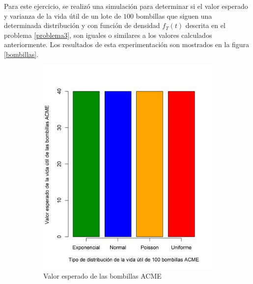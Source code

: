 \documentclass{article}
\begin{document}
Para este ejercicio, se realizó una simulación para determinar si el valor esperado y varianza de la vida útil de un lote de $100$ bombillas que siguen una determinada distribución y con función de densidad $f_{T}(t)$ descrita en el problema \ref{problema3}, son iguales o similares a los valores calculados anteriormente. Los resultados de esta experimentación son mostrados en la figura \ref{bombillas}. 

\begin{figure}[h]
    \begin{center}
    \captionsetup{justification=centering}
    \begin{subfigure}[b]{0.45\textwidth}
        \includegraphics[scale=0.5]{Figures/VEBombillas.png}
        \caption{Valor esperado de las bombillas ACME}
        \label{bombillasVE}
    \end{subfigure}
    \begin{subfigure}[b]{0.5\textwidth}

\end{subfigure}
\end{center}
\end{figure}
\end{document}
